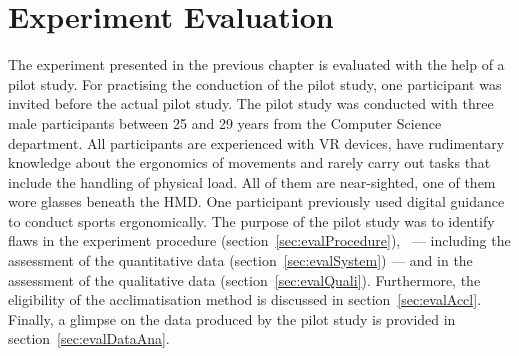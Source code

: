 \chapter{Experiment Evaluation}
\label{chapter:study_evaluation}
The experiment presented in the previous chapter is evaluated with the help of a pilot study. For practising the conduction of the pilot study, one participant was invited before the actual pilot study. The pilot study was conducted with three male participants between 25 and 29 years from the Computer Science department. All participants are experienced with VR devices, have rudimentary knowledge about the ergonomics of movements and rarely carry out tasks that include the handling of physical load. All of them are near-sighted, one of them wore glasses beneath the HMD. One participant previously used digital guidance to conduct sports ergonomically. The purpose of the pilot study was to identify flaws in the experiment procedure (section~\ref{sec:evalProcedure}), \exgo\ --- including the assessment of the quantitative data (section~\ref{sec:evalSystem}) --- and in the assessment of the qualitative data (section~\ref{sec:evalQuali}). Furthermore, the eligibility of the acclimatisation method is discussed in section~\ref{sec:evalAccl}. Finally, a glimpse on the data produced by the pilot study is provided in section~\ref{sec:evalDataAna}.

